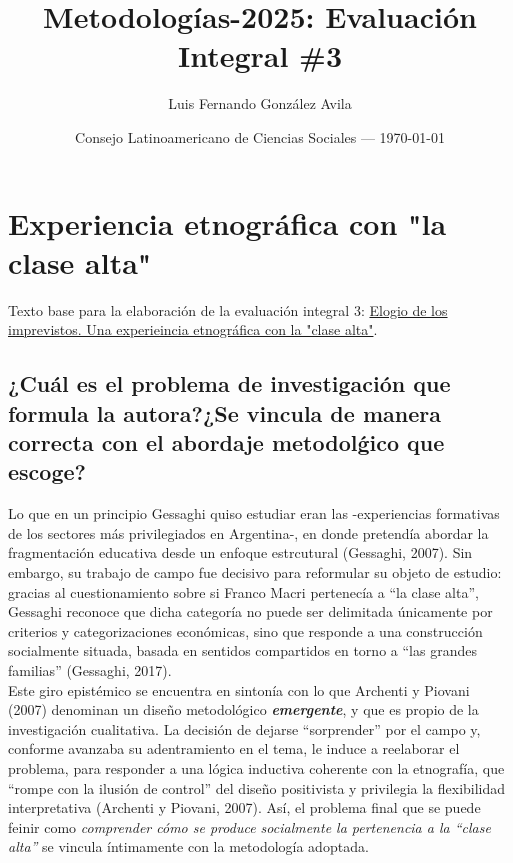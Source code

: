 \documentclass{article}
\title{Metodologías-2025: Evaluación Integral \#3} %
\author{Luis Fernando González Avila} %
\date{Consejo Latinoamericano de Ciencias Sociales --- \today} %
\begin{document}
\maketitle %


\section*{Experiencia etnográfica con "la clase alta"} %

\begin{info} %
	Texto base para la elaboración de la evaluación integral 3: \href{https://notablesdelaciencia.conicet.gov.ar/bitstream/handle/11336/36311/CONICET_Digital_Nro.df3bf643-f355-4e13-8a3e-3bb89a41670a_A.pdf?sequence=2}{Elogio de los imprevistos. Una experieincia etnográfica con la "clase alta"}.
\end{info}

\subsection*{¿Cuál es el problema de investigación que formula la autora?¿Se vincula de manera correcta con el abordaje metodolǵico que escoge?}

Lo que en un principio Gessaghi quiso estudiar eran las -experiencias formativas de los sectores más privilegiados en Argentina-, en donde pretendía abordar la fragmentación educativa desde un enfoque estrcutural (Gessaghi, 2007). Sin embargo, su trabajo de campo fue decisivo para reformular su objeto de estudio: gracias al cuestionamiento sobre si Franco Macri pertenecía a “la clase alta”, Gessaghi reconoce que dicha categoría no puede ser delimitada únicamente por criterios y categorizaciones económicas, sino que responde a una construcción socialmente situada, basada en sentidos compartidos en torno a “las grandes familias” (Gessaghi, 2017).\\

\noindent Este giro epistémico se encuentra en sintonía con lo que Archenti y Piovani (2007) denominan un diseño metodológico \textit{\textbf{emergente}}, y que es propio de la investigación cualitativa. La decisión de dejarse “sorprender” por el campo y, conforme avanzaba su adentramiento en el tema, le induce a reelaborar el problema, para responder a una lógica inductiva coherente con la etnografía, que “rompe con la ilusión de control” del diseño positivista y privilegia la flexibilidad interpretativa (Archenti y Piovani, 2007). Así, el problema final que se puede feinir como \textit{comprender cómo se produce socialmente la pertenencia a la “clase alta”} se vincula íntimamente con la metodología adoptada.
\end{document}
